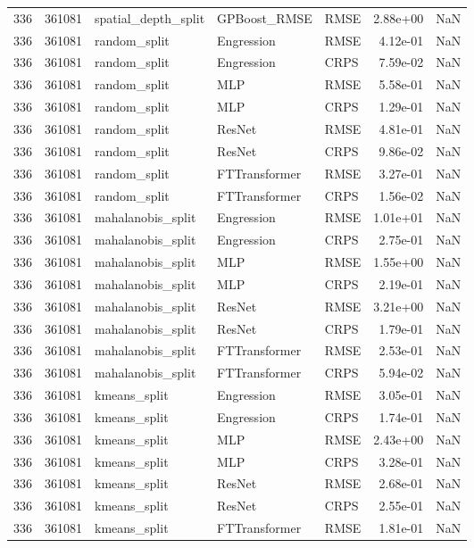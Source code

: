 \begin{tabular}{rrlllrr}
336 & 361081 & spatial\_depth\_split & GPBoost\_RMSE & RMSE & 2.88e+00 & NaN \\
336 & 361081 & random\_split & Engression & RMSE & 4.12e-01 & NaN \\
336 & 361081 & random\_split & Engression & CRPS & 7.59e-02 & NaN \\
336 & 361081 & random\_split & MLP & RMSE & 5.58e-01 & NaN \\
336 & 361081 & random\_split & MLP & CRPS & 1.29e-01 & NaN \\
336 & 361081 & random\_split & ResNet & RMSE & 4.81e-01 & NaN \\
336 & 361081 & random\_split & ResNet & CRPS & 9.86e-02 & NaN \\
336 & 361081 & random\_split & FTTransformer & RMSE & 3.27e-01 & NaN \\
336 & 361081 & random\_split & FTTransformer & CRPS & 1.56e-02 & NaN \\
336 & 361081 & mahalanobis\_split & Engression & RMSE & 1.01e+01 & NaN \\
336 & 361081 & mahalanobis\_split & Engression & CRPS & 2.75e-01 & NaN \\
336 & 361081 & mahalanobis\_split & MLP & RMSE & 1.55e+00 & NaN \\
336 & 361081 & mahalanobis\_split & MLP & CRPS & 2.19e-01 & NaN \\
336 & 361081 & mahalanobis\_split & ResNet & RMSE & 3.21e+00 & NaN \\
336 & 361081 & mahalanobis\_split & ResNet & CRPS & 1.79e-01 & NaN \\
336 & 361081 & mahalanobis\_split & FTTransformer & RMSE & 2.53e-01 & NaN \\
336 & 361081 & mahalanobis\_split & FTTransformer & CRPS & 5.94e-02 & NaN \\
336 & 361081 & kmeans\_split & Engression & RMSE & 3.05e-01 & NaN \\
336 & 361081 & kmeans\_split & Engression & CRPS & 1.74e-01 & NaN \\
336 & 361081 & kmeans\_split & MLP & RMSE & 2.43e+00 & NaN \\
336 & 361081 & kmeans\_split & MLP & CRPS & 3.28e-01 & NaN \\
336 & 361081 & kmeans\_split & ResNet & RMSE & 2.68e-01 & NaN \\
336 & 361081 & kmeans\_split & ResNet & CRPS & 2.55e-01 & NaN \\
336 & 361081 & kmeans\_split & FTTransformer & RMSE & 1.81e-01 & NaN \\

\end{tabular}

